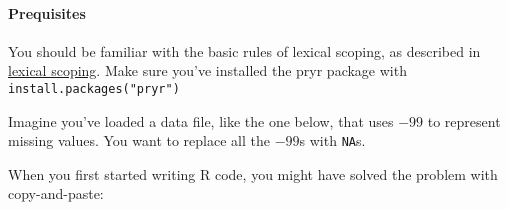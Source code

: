 \paragraph{Prequisites}

You should be familiar with the basic rules of lexical scoping, as
described in \hyperref[lexical-scoping]{lexical scoping}. Make sure
you've installed the pryr package with \texttt{install.packages("pryr")}


Imagine you've loaded a data file, like the one below, that uses \(-99\)
to represent missing values. You want to replace all the \(-99\)s with
\texttt{NA}s.

\begin{Shaded}
\begin{Highlighting}[]
\NormalTok{(}\NormalTok{)}
\StringTok{ }\NormalTok{(}\NormalTok{(}\NormalTok{, }\NormalTok{(}\NormalTok{(}\NormalTok{:}\NormalTok{, -}\NormalTok{), }\NormalTok{, } \NormalTok{)))}
\StringTok{ }\NormalTok{letters[}\NormalTok{:}\NormalTok{]}
\end{Highlighting}
\end{Shaded}

When you first started writing R code, you might have solved the problem
with copy-and-paste:

\begin{Shaded}
\begin{Highlighting}[]
\NormalTok{df$a[df$a ==}\StringTok{ }\NormalTok{-}\NormalTok{] <-}\StringTok{ }
\NormalTok{df$b[df$b ==}\StringTok{ }\NormalTok{-}\NormalTok{] <-}\StringTok{ }
\NormalTok{df$c[df$c ==}\StringTok{ }\NormalTok{-}\NormalTok{] <-}\StringTok{ }
\NormalTok{df$d[df$d ==}\StringTok{ }\NormalTok{-}\NormalTok{] <-}\StringTok{ }
\NormalTok{df$e[df$e ==}\StringTok{ }\NormalTok{-}\NormalTok{] <-}\StringTok{ }
\NormalTok{df$f[df$g ==}\StringTok{ }\NormalTok{-}\NormalTok{] <-}\StringTok{ }
\end{Highlighting}
\end{Shaded}

